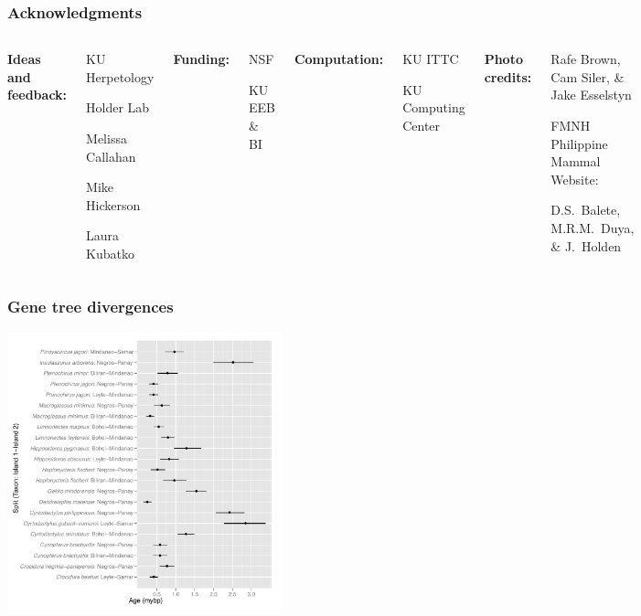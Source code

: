 \begin{frame}
    \frametitle{Acknowledgments}
    \begin{columns}[c]
            {\bf Ideas and feedback:}
            \begin{myitemize}
                \item KU Herpetology
                \item Holder Lab
                \item Melissa Callahan
                \item Mike Hickerson
                \item Laura Kubatko
            \end{myitemize}
            {\bf Funding:}
            \begin{myitemize}
                \item NSF
                \item KU EEB \& BI
            \end{myitemize}
            {\bf Computation:}
            \begin{myitemize}
                \item KU ITTC
                \item KU Computing Center
            \end{myitemize}
            {\bf Photo credits:}
            \begin{myitemize}
                \item Rafe Brown, Cam Siler, \& Jake Esselstyn
                \item FMNH Philippine Mammal Website:
                    \begin{myitemize}
                        \item D.S.\ Balete, M.R.M.\ Duya, \& J.\ Holden
                    \end{myitemize}
            \end{myitemize}
    \end{columns}
\end{frame}


\begin{frame}[noframenumbering]
    \frametitle{Gene tree divergences}
    \centerline{
    \includegraphics[height=8cm]{images/gene_splits.pdf}}
\end{frame}

